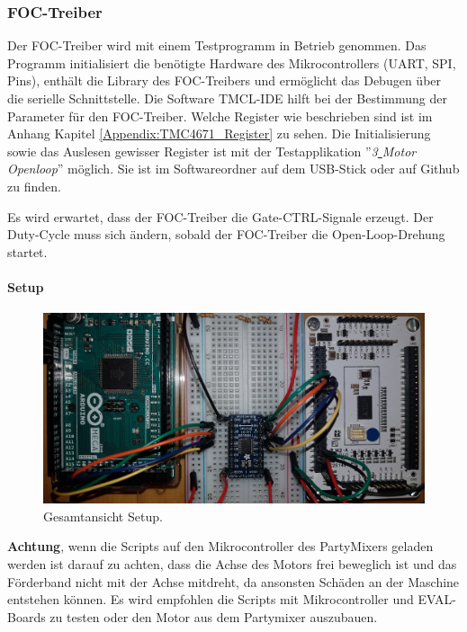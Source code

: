 \subsubsection{FOC-Treiber}
\label{subsubsec:Inbetriebnahme_FOC_Treiber}
Der FOC-Treiber wird mit einem Testprogramm in Betrieb genommen. Das Programm initialisiert die benötigte Hardware des Mikrocontrollers (UART, SPI, Pins), enthält die Library des FOC-Treibers und ermöglicht das Debugen über die serielle Schnittstelle. Die Software TMCL-IDE hilft bei der Bestimmung der Parameter für den FOC-Treiber. Welche Register wie beschrieben sind ist im Anhang Kapitel \ref{Appendix:TMC4671_Register} zu sehen. Die Initialisierung sowie das Auslesen gewisser Register ist mit der Testapplikation ''\textit{3\underline{ }Motor\underline{ }Openloop}'' möglich. Sie ist im Softwareordner auf dem USB-Stick oder auf Github \cite{aebi_projekt-6softwareatmega_2020} zu finden.

Es wird erwartet, dass der FOC-Treiber die Gate-CTRL-Signale erzeugt. Der Duty-Cycle muss sich ändern, sobald der FOC-Treiber die Open-Loop-Drehung startet.

\paragraph{Setup}\mbox{}

\begin{figure}[H]
	\centering
	\includegraphics[angle=270,width=0.8 \textwidth]{graphics/1_komplett}
	\caption{Gesamtansicht Setup.}
	\label{fig:1_komplett}
\end{figure}

\textbf{Achtung}, wenn die Scripts auf den Mikrocontroller des PartyMixers geladen werden ist darauf zu achten, dass die Achse des Motors frei beweglich ist und das Förderband nicht mit der Achse mitdreht, da ansonsten Schäden an der Maschine entstehen können. Es wird empfohlen die Scripts mit Mikrocontroller und EVAL-Boards zu testen oder den Motor aus dem Partymixer auszubauen.

